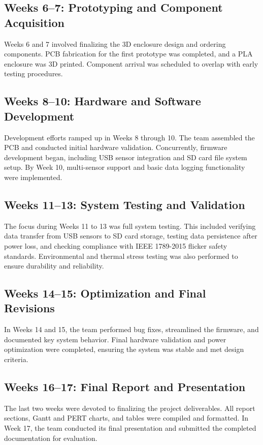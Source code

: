 \documentclass[12pt]{article}
\begin{document}
\subsection*{Weeks 6–7: Prototyping and Component Acquisition}
Weeks 6 and 7 involved finalizing the 3D enclosure design and ordering components. PCB fabrication for the first prototype was completed, and a PLA enclosure was 3D printed. Component arrival was scheduled to overlap with early testing procedures.

\subsection*{Weeks 8–10: Hardware and Software Development}
Development efforts ramped up in Weeks 8 through 10. The team assembled the PCB and conducted initial hardware validation. Concurrently, firmware development began, including USB sensor integration and SD card file system setup. By Week 10, multi-sensor support and basic data logging functionality were implemented.

\subsection*{Weeks 11–13: System Testing and Validation}
The focus during Weeks 11 to 13 was full system testing. This included verifying data transfer from USB sensors to SD card storage, testing data persistence after power loss, and checking compliance with IEEE 1789-2015 flicker safety standards. Environmental and thermal stress testing was also performed to ensure durability and reliability.

\subsection*{Weeks 14–15: Optimization and Final Revisions}
In Weeks 14 and 15, the team performed bug fixes, streamlined the firmware, and documented key system behavior. Final hardware validation and power optimization were completed, ensuring the system was stable and met design criteria.

\subsection*{Weeks 16–17: Final Report and Presentation}
The last two weeks were devoted to finalizing the project deliverables. All report sections, Gantt and PERT charts, and tables were compiled and formatted. In Week 17, the team conducted its final presentation and submitted the completed documentation for evaluation.
\end{document}
